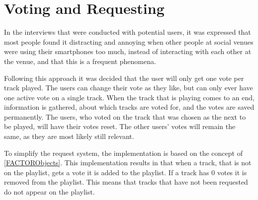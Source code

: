 \section{Voting and Requesting}
\label{VotingAndRequesting}
In the interviews that were conducted with potential users, it was expressed that most people found it distracting and annoying when other people at social venues were using their smartphones too much, instead of interacting with each other at the venue, and that this is a frequent phenomena.

Following this approach it was decided that the user will only get one vote per track played.
The users can change their vote as they like, but can only ever have one active vote on a single track.
When the track that is playing comes to an end, information is gathered, about which tracks are voted for, and the votes are saved permanently.
The users, who voted on the track that was chosen as the next to be played, will have their votes reset. The other users’ votes will remain the same, as they are most likely still relevant.

To simplify the request system, the implementation is based on the concept of \cref{FACTORObjects}. This implementation results in that when a track, that is not on the playlist, gets a vote it is added to the playlist. If a track has 0 votes it is removed from the playlist. This means that tracks that have not been requested do not appear on the playlist.
